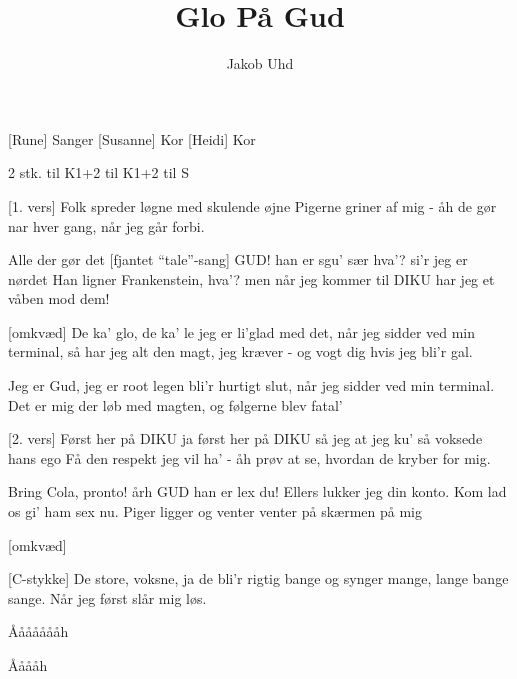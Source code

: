 \documentclass[a4paper]{article}
\title{Glo På Gud}
\author{Jakob Uhd}
\begin{document}
\maketitle

\begin{roles}
  [Rune] Sanger
  [Susanne] Kor
  [Heidi] Kor
\end{roles}

\begin{props}
   2 stk. til K1+2
   til K1+2
   til S
\end{props}
\begin{song}

[1. vers] Folk spreder løgne
med skulende øjne
Pigerne griner af mig
- åh de gør nar hver gang, når jeg går forbi.

 Alle der gør det
[fjantet ``tale''-sang] GUD! han er sgu' sær hva'?
 si'r jeg er nørdet
 Han ligner Frankenstein, hva'?
 men når jeg kommer til DIKU
har jeg et våben mod dem!

[omkvæd]
De ka' glo, de ka' le
jeg er li'glad med det,
når jeg sidder ved min terminal,
så har jeg alt den magt, jeg kræver
- og vogt dig hvis jeg bli'r gal.

Jeg er Gud, jeg er root
legen bli'r hurtigt slut,
når jeg sidder ved min terminal.
Det er mig der løb med magten,
og følgerne blev fatal'

[2. vers] Først her på DIKU
 ja først her på DIKU
 så jeg at jeg ku'
 så voksede hans ego
 Få den respekt jeg vil ha'
- åh prøv at se, hvordan de kryber for mig.

Bring Cola, pronto!
 årh GUD han er lex du!
 Ellers lukker jeg din konto.
 Kom lad os gi' ham sex nu.
 Piger ligger og venter
venter på skærmen på mig

[omkvæd]

[C-stykke] De store, voksne, ja de bli'r rigtig bange
og synger mange, lange bange sange.
Når jeg først slår mig løs.

 Åååååååh


 Ååååh


\end{song}
\end{document}
